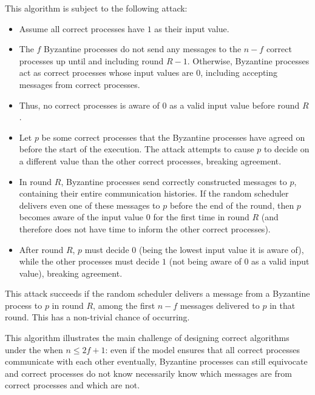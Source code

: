 This algorithm is subject to the following attack:
\begin{itemize}
    \item Assume all correct processes have $1$ as their input value.
    \item The $f$ Byzantine processes do not send any messages to the $n-f$ correct processes up until and including round $R-1$. Otherwise, Byzantine processes act as correct processes whose input values are $0$, including accepting messages from correct processes.
    \item Thus, no correct processes is aware of $0$ as a valid input value before round $R$.
    \item Let $p$ be some correct processes that the Byzantine processes have agreed on before the start of the execution. The attack attempts to cause $p$ to decide on a different value than the other correct processes, breaking agreement.
    \item In round $R$, Byzantine processes send correctly constructed messages to $p$, containing their entire communication histories. If the random scheduler delivers even one of these messages to $p$ before the end of the round, then $p$ becomes aware of the input value $0$ for the first time in round $R$ (and therefore does not have time to inform the other correct processes).
    \item After round $R$, $p$ must decide $0$ (being the lowest input value it is aware of), while the other processes must decide $1$ (not being aware of $0$ as a valid input value), breaking agreement.
\end{itemize}

This attack succeeds if the random scheduler delivers a message from a Byzantine process to $p$ in round $R$, among the first $n-f$ messages delivered to $p$ in that round. This has a non-trivial chance of occurring.

This algorithm illustrates the main challenge of designing correct algorithms under the \model when $n\leq 2f+1$: even if the model ensures that all correct processes communicate with each other eventually, Byzantine processes can still equivocate and correct processes do not know necessarily know which messages are from correct processes and which are not.